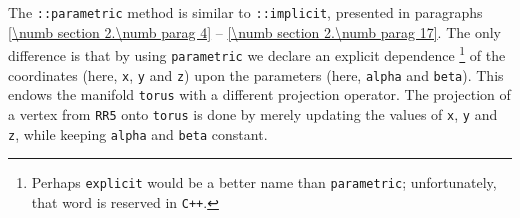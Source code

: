 The {\small\tt{}::parametric} method is similar to {\small\tt{}::implicit},
presented in paragraphs \ref{\numb section 2.\numb parag 4} --
\ref{\numb section 2.\numb parag 17}.
The only difference is that by using {\small\tt parametric} we declare an explicit dependence%
\footnote{{} Perhaps {\small\tt explicit} would be a better name than {\small\tt parametric};
unfortunately, that word is reserved in {\small\tt C++}.}
of the coordinates (here, {\small\tt x}, {\small\tt y} and {\small\tt z}) upon the parameters
(here, {\small\tt alpha} and {\small\tt beta}).
This endows the manifold {\small\tt torus} with a different projection operator.
The projection of a vertex from {\small\tt RR5} onto {\small\tt torus} is done by merely updating
the values of {\small\tt x}, {\small\tt y} and {\small\tt z}, while keeping {\small\tt alpha} and
{\small\tt beta} constant.
